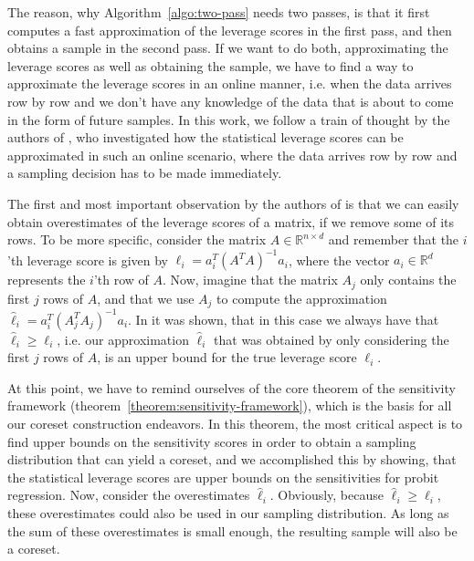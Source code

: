 The reason, why Algorithm~\ref{algo:two-pass} needs two passes,
is that it first computes a fast approximation of the leverage
scores in the first pass, and then obtains a sample in the
second pass.
If we want to do both, approximating the leverage scores as
well as obtaining the sample, we have to find a way to
approximate the leverage scores in an online manner,
i.e. when the data arrives row by row and we don't have
any knowledge of the data that is about to come in the form
of future samples.
In this work, we follow a train of thought by the
authors of \cite{online-row-sampling}, who investigated
how the statistical leverage scores can be approximated
in such an online scenario, where the data arrives row by row
and a sampling decision has to be made immediately.

The first and most important observation by the authors of
\cite{online-row-sampling} is that we can easily obtain
overestimates of the leverage scores of a matrix, if we
remove some of its rows.
To be more specific, consider the matrix
$A \in \mathbb{R}^{n \times d}$ and remember that the
$i$'th leverage score is given by $\ell_i = a_i^T (A^TA)^{-1} a_i$,
where the vector $a_i \in \mathbb{R}^d$ represents the
$i$'th row of $A$.
Now, imagine that the matrix $A_j$ only contains the first
$j$ rows of $A$, and that we use $A_j$ to compute the
approximation $\hat{\ell}_i = a_i^T (A_j^TA_j)^{-1} a_i$.
In \cite{online-row-sampling} it was shown, that in this
case we always have that $\hat{\ell}_i \geq \ell_i$, i.e.
our approximation $\hat{\ell}_i$ that was obtained by only
considering the first $j$ rows of $A$, is an upper bound
for the true leverage score $\ell_i$.

At this point, we have to remind ourselves of the core theorem
of the sensitivity framework
(theorem~\ref{theorem:sensitivity-framework}), which is the basis
for all our coreset construction endeavors.
In this theorem, the most critical aspect is to find upper bounds
on the sensitivity scores in order to obtain a sampling
distribution that can yield a coreset, and we accomplished
this by showing, that the statistical leverage scores are
upper bounds on the sensitivities for probit regression.
Now, consider the overestimates $\hat{\ell}_i$.
Obviously, because $\hat{\ell}_i \geq \ell_i$, these overestimates
could also be used in our sampling distribution.
As long as the sum of these overestimates is small enough, the
resulting sample will also be a coreset.

